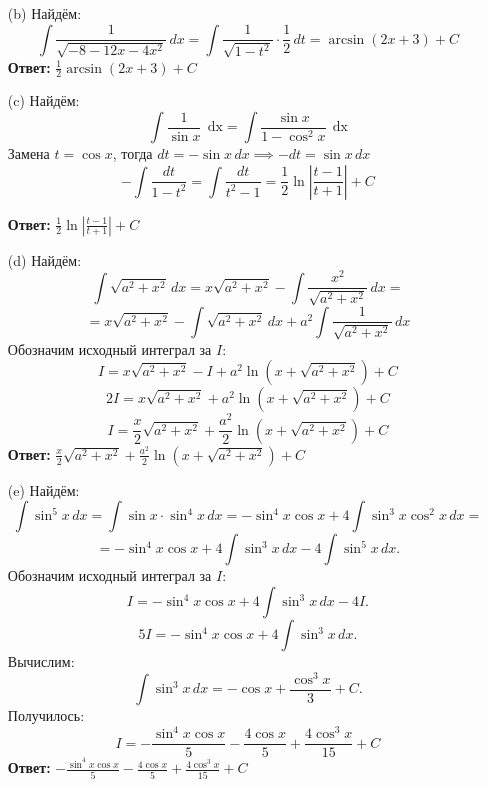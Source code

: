 \documentclass[a4paper]{article}
\renewcommand{\f}[2]{\frac{#1}{#2}}
\newcommand{\dx}{\;\text{dx}}
\begin{document}
\begin{enumerate}
\begin{enumerate}
        \item[(b)]Найдём:
        $$\int \frac{1}{\sqrt{-8 - 12x - 4x^2}} \, dx = \int \frac{1}{\sqrt{1 - t^2}} \cdot \f{1}{2} \, dt
         = \arcsin(2x+3) + C$$
         \textbf{Ответ: } $\f{1}{2} \arcsin(2x+3) + C$

        \item[(c)]Найдём:
        $$\int \frac{1}{\sin x} \, \dx = \int \frac{\sin x}{1 - \cos^2 x} \, \dx$$
        Замена \(t = \cos x\), тогда \(dt = -\sin x \, dx \implies -dt = \sin x \, dx\)
        $$-\int \frac{dt}{1 - t^2} =\int \frac{dt}{t^2-1}= \frac{1}{2} \ln \left| \frac{t-1}{t+1} \right| + C$$

        \textbf{Ответ: } $\frac{1}{2} \ln \left| \frac{t-1}{t+1} \right| + C$\\

        \item[(d)]Найдём:
        $$\int \sqrt{a^2 + x^2} \, dx = x \sqrt{a^2 + x^2} - \int \frac{x^2}{\sqrt{a^2 + x^2}} \, dx =$$
        $$=x \sqrt{a^2 + x^2} - \int \sqrt{a^2 + x^2} \, dx + a^2 \int \frac{1}{\sqrt{a^2 + x^2}} \, dx$$
        Обозначим исходный интеграл за \(I\): 
        \[
        I = x \sqrt{a^2 + x^2} - I + a^2 \ln \left(x + \sqrt{a^2 + x^2}\right) + C
        \]  
        \[
        2I = x \sqrt{a^2 + x^2} + a^2 \ln \left(x + \sqrt{a^2 + x^2}\right) + C
        \]
        \[
        I = \frac{x}{2} \sqrt{a^2 + x^2} + \frac{a^2}{2} \ln \left(x + \sqrt{a^2 + x^2}\right) + C
        \]  
        \textbf{Ответ: } $\frac{x}{2} \sqrt{a^2 + x^2} + \frac{a^2}{2} \ln \left(x + \sqrt{a^2 + x^2}\right) + C$\\

        \item[(e)]Найдём:
        \[
        \int \sin^5 x \, dx = \int \sin x \cdot \sin^4 x \, dx = -\sin^4 x \cos x + 4 \int \sin^3 x \cos^2 x \, dx=
        \]
        \[
        =-\sin^4 x \cos x+4 \int \sin^3 x \, dx - 4 \int \sin^5 x \, dx.
        \]
        Обозначим исходный интеграл за \(I\):
        \[
        I = -\sin^4 x \cos x + 4 \int \sin^3 x \, dx - 4I.
        \]
        \[
        5I = -\sin^4 x \cos x + 4 \int \sin^3 x \, dx.
        \]
        Вычислим:
        \[
        \int \sin^3 x \, dx = -\cos x + \frac{\cos^3 x}{3} + C.
        \]
        Получилось:
        \[
        I = -\frac{\sin^4 x \cos x}{5} - \frac{4\cos x}{5} + \frac{4\cos^3 x}{15} + C
        \]
        \textbf{Ответ: } $-\frac{\sin^4 x \cos x}{5} - \frac{4\cos x}{5} + \frac{4\cos^3 x}{15} + C$\\



\end{enumerate}
\end{enumerate}
\end{document}
